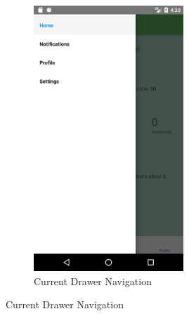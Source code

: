 \documentclass[compsoc, 10, draftclsnofoot, onecolumn]{IEEEtran}
\begin{document}
\begin{figure}[h]
\begin{subfigure}{0.5\textwidth}
\includegraphics[height=10cm]{drawer.png}
  \caption{Current Drawer Navigation}	
\end{subfigure}
\end{figure}
\FloatBarrier
\end{document}
